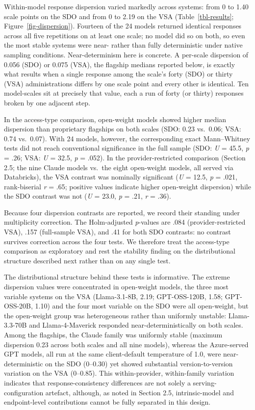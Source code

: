 \documentclass[
]{article}
\begin{document}
Within-model response dispersion varied markedly across systems: from 0
to 1.40 scale points on the SDO and from 0 to 2.19 on the VSA
(Table~\ref{tbl-results}; Figure~\ref{fig-dispersion}). Fourteen of the
24 models returned identical responses across all five repetitions on at
least one scale; no model did so on both, so even the most stable
systems were near- rather than fully deterministic under native sampling
conditions. Near-determinism here is concrete. A per-scale dispersion of
0.056 (SDO) or 0.075 (VSA), the flagship medians reported below, is
exactly what results when a single response among the scale's forty
(SDO) or thirty (VSA) administrations differs by one scale point and
every other is identical. Ten model-scales sit at precisely that value,
each a run of forty (or thirty) responses broken by one adjacent step.

In the access-type comparison, open-weight models showed higher median
dispersion than proprietary flagships on both scales (SDO: 0.23
vs.~0.06; VSA: 0.74 vs.~0.07). With 24 models, however, the
corresponding exact Mann--Whitney tests did not reach conventional
significance in the full sample (SDO: \emph{U} = 45.5, \emph{p} = .26;
VSA: \emph{U} = 32.5, \emph{p} = .052). In the provider-restricted
comparison (Section 2.5; the nine Claude models vs.~the eight
open-weight models, all served via Databricks), the VSA contrast was
nominally significant (\emph{U} = 12.5, \emph{p} = .021, rank-biserial
\emph{r} = .65; positive values indicate higher open-weight dispersion)
while the SDO contrast was not (\emph{U} = 23.0, \emph{p} = .21,
\emph{r} = .36).

Because four dispersion contrasts are reported, we record their standing
under multiplicity correction. The Holm-adjusted \emph{p}-values are
.084 (provider-restricted VSA), .157 (full-sample VSA), and .41 for both
SDO contrasts: no contrast survives correction across the four tests. We
therefore treat the access-type comparison as exploratory and rest the
stability finding on the distributional structure described next rather
than on any single test.

The distributional structure behind these tests is informative. The
extreme dispersion values were concentrated in open-weight models, the
three most variable systems on the VSA (Llama-3.1-8B, 2.19;
GPT-OSS-120B, 1.58; GPT-OSS-20B, 1.10) and the four most variable on the
SDO were all open-weight, but the open-weight group was heterogeneous
rather than uniformly unstable: Llama-3.3-70B and Llama-4-Maverick
responded near-deterministically on both scales. Among the flagships,
the Claude family was uniformly stable (maximum dispersion 0.23 across
both scales and all nine models), whereas the Azure-served GPT models,
all run at the same client-default temperature of 1.0, were
near-deterministic on the SDO (0--0.30) yet showed substantial
version-to-version variation on the VSA (0--0.85). This within-provider,
within-family variation indicates that response-consistency differences
are not solely a serving-configuration artefact, although, as noted in
Section 2.5, intrinsic-model and endpoint-level contributions cannot be
fully separated in this design.
\end{document}
